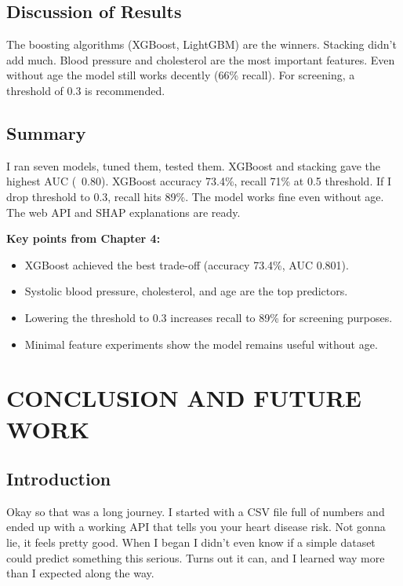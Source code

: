 \documentclass[12pt, a4paper, oneside]{book}
\begin{document}
\section{Discussion of Results}
The boosting algorithms (XGBoost, LightGBM) are the winners. Stacking didn't add much. Blood pressure and cholesterol are the most important features. Even without age the model still works decently (66\% recall). For screening, a threshold of 0.3 is recommended.

\section{Summary}
I ran seven models, tuned them, tested them. XGBoost and stacking gave the highest AUC (~0.80). XGBoost accuracy 73.4\%, recall 71\% at 0.5 threshold. If I drop threshold to 0.3, recall hits 89\%. The model works fine even without age. The web API and SHAP explanations are ready.

\begin{takeaway}
\textbf{Key points from Chapter 4:}
\begin{itemize}
  \item XGBoost achieved the best trade-off (accuracy 73.4\%, AUC 0.801).
  \item Systolic blood pressure, cholesterol, and age are the top predictors.
  \item Lowering the threshold to 0.3 increases recall to 89\% for screening purposes.
  \item Minimal feature experiments show the model remains useful without age.
\end{itemize}
\end{takeaway}

\chapter{CONCLUSION AND FUTURE WORK}

\section{Introduction}
Okay so that was a long journey. I started with a CSV file full of numbers and ended up with a working API that tells you your heart disease risk. Not gonna lie, it feels pretty good. When I began I didn't even know if a simple dataset could predict something this serious. Turns out it can, and I learned way more than I expected along the way.
\end{document}
